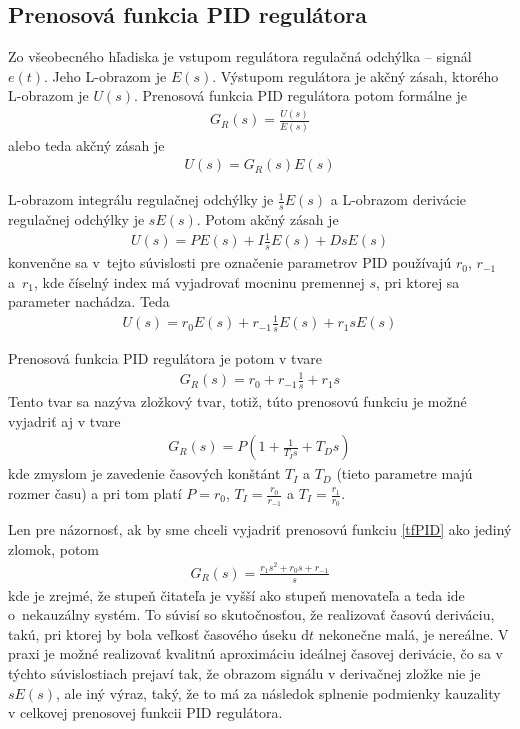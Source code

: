 \documentclass[a4paper, 10pt, ]{article}
\begin{document}
\subsection{Prenosová funkcia PID regulátora}

Zo všeobecného hľadiska je vstupom regulátora regulačná odchýlka -- signál $e(t)$. Jeho L-obrazom je $E(s)$. Výstupom regulátora je akčný zásah, ktorého L-obrazom je $U(s)$. Prenosová funkcia PID regulátora potom formálne je
\begin{align}
    G_R(s) = \frac{U(s)}{E(s)}
\end{align}
alebo teda akčný zásah je
\begin{align}
    U(s) = G_R(s) E(s)
\end{align}

L-obrazom integrálu regulačnej odchýlky je $\frac{1}{s} E(s)$ a L-obrazom derivácie regulačnej odchýlky je $sE(s)$. Potom akčný zásah je
\begin{align}
    U(s) = P E(s) + I  \frac{1}{s} E(s) + D  sE(s)
\end{align}
konvenčne sa v~tejto súvislosti pre označenie parametrov PID používajú $r_0$, $r_{-1}$ a~$r_1$, kde číselný index má vyjadrovať mocninu premennej $s$, pri ktorej sa parameter nachádza. Teda
\begin{align}
    U(s) = r_0 E(s) + r_{-1}  \frac{1}{s} E(s) + r_1  sE(s)
\end{align}

Prenosová funkcia PID regulátora je potom v tvare
\begin{align} \label{tfPID}
    G_R(s) = r_0  + r_{-1}  \frac{1}{s}  + r_1  s
\end{align}
Tento tvar sa nazýva zložkový tvar, totiž, túto prenosovú funkciu je možné vyjadriť aj v tvare
\begin{align}
    G_R(s) = P \left( 1 +  \frac{1}{T_I s}  +  T_D  s \right)
\end{align}
kde zmyslom je zavedenie časových konštánt $T_I$ a $T_D$ (tieto parametre majú rozmer času) a pri tom platí $P = r_0$, $T_I = \frac{r_0}{r_{-1}}$ a $T_I = \frac{r_1}{r_0}$.

Len pre názornosť, ak by sme chceli vyjadriť prenosovú funkciu \eqref{tfPID} ako jediný zlomok, potom
\begin{align} \label{tfPID2}
    G_R(s) =  \frac{ r_1 s^2 + r_0 s + r_{-1} }{s}
\end{align}
kde je zrejmé, že stupeň čitateľa je vyšší ako stupeň menovateľa a teda ide o~nekauzálny systém. To súvisí so skutočnosťou, že realizovať časovú deriváciu, takú, pri ktorej by bola veľkosť časového úseku $\text{d}t$ nekonečne malá, je nereálne. V praxi je možné realizovať kvalitnú aproximáciu ideálnej časovej derivácie, čo sa v týchto súvislostiach prejaví tak, že obrazom signálu v derivačnej zložke nie je $sE(s)$, ale iný výraz, taký, že to má za následok splnenie podmienky kauzality v celkovej prenosovej funkcii PID regulátora.
\end{document}
